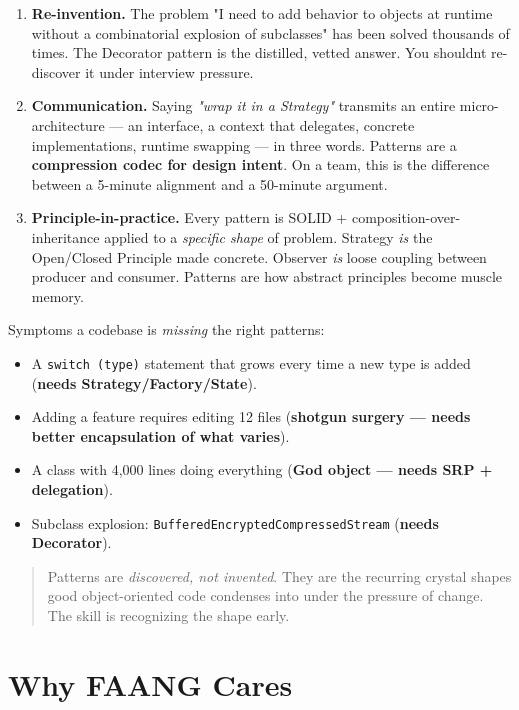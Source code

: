\documentclass[11pt]{article}
\providecommand{\tightlist}{\setlength{\itemsep}{1pt}\setlength{\parskip}{0pt}}
\begin{document}
\begin{enumerate}
\def\labelenumi{\arabic{enumi}.}
\item
  \textbf{Re-invention.} The problem "I need to add behavior to objects at runtime without a combinatorial explosion of subclasses" has been solved thousands of times. The Decorator pattern is the distilled, vetted answer. You shouldn\textquotesingle t re-discover it under interview pressure.
\item
  \textbf{Communication.} Saying \emph{"wrap it in a Strategy"} transmits an entire micro-architecture --- an interface, a context that delegates, concrete implementations, runtime swapping --- in three words. Patterns are a \textbf{compression codec for design intent}. On a team, this is the difference between a 5-minute alignment and a 50-minute argument.
\item
  \textbf{Principle-in-practice.} Every pattern is SOLID + composition-over-inheritance applied to a \emph{specific shape} of problem. Strategy \emph{is} the Open/Closed Principle made concrete. Observer \emph{is} loose coupling between producer and consumer. Patterns are how abstract principles become muscle memory.
\end{enumerate}

Symptoms a codebase is \emph{missing} the right patterns:

\begin{itemize}
\tightlist
\item
  A \texttt{switch\ (type)} statement that grows every time a new type is added (\textbf{needs Strategy/Factory/State}).
\item
  Adding a feature requires editing 12 files (\textbf{shotgun surgery --- needs better encapsulation of what varies}).
\item
  A class with 4,000 lines doing everything (\textbf{God object --- needs SRP + delegation}).
\item
  Subclass explosion: \texttt{BufferedEncryptedCompressedStream} (\textbf{needs Decorator}).
\end{itemize}

\begin{quote}
Patterns are \emph{discovered, not invented}. They are the recurring crystal shapes good object-oriented code condenses into under the pressure of change. The skill is recognizing the shape early.
\end{quote}

\section{Why FAANG Cares}\label{why-faang-cares}
\end{document}
